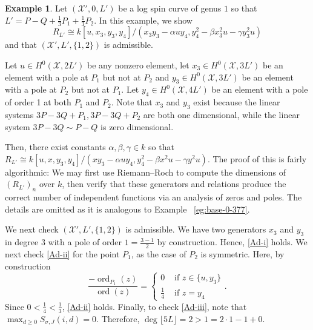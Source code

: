 \documentclass{amsart}
\theoremstyle{plain}
\theoremstyle{definition}
\newtheorem{example}[thm]{Example}
\theoremstyle{remark}
\numberwithin{equation}{section}
\DeclareMathOperator{\ord}{ord}
\newcommand\sx{\mathscr X}
\newcommand{\halfcan}{L}
\begin{document}
\begin{example}
\label{eg:base-1-33}
Let $(\sx',0 ,\halfcan')$ be a log spin curve of genus $1$ so that $\halfcan' = P - Q + \frac{1}{3}P_1 + \frac{1}{3}P_2$. In this example, we show
$$R_{\halfcan'} \cong k[u, x_3, y_3, y_4]/(x_3 y_3- \alpha uy_4, y_4^2 - \beta x_3^2 u - \gamma y_3^2u)$$
and that $(\sx', \halfcan',\{1,2\})$ is admissible.

Let $u \in H^0(\sx,2\halfcan')$ be any nonzero element, let $x_3 \in H^0(\sx,3\halfcan')$ be an element with a pole at $P_1$ but not at $P_2$ and $y_3 \in H^0(\sx,3\halfcan')$ be an element with a pole at $P_2$ but not at $P_1$. Let $y_4 \in H^0(\sx,4\halfcan')$ be an element with a pole of order 1 at both $P_1$ and $P_2$. Note that $x_3$ and $y_3$ exist because the linear systems $3P - 3Q + P_1, 3P - 3Q + P_2$ are both one dimensional, while the linear system $3P - 3Q \sim P - Q$ is zero dimensional.

Then, there exist constants $\alpha,\beta,\gamma \in k$ so that 
$R_{\halfcan'} \cong k[u, x, y_3, y_4]/(xy_3- \alpha uy_4, y_4^2 - \beta x^2 u - \gamma y^2u).$ The proof of this is fairly algorithmic: We may first use Riemann--Roch to compute the dimensions of $(R_{\halfcan'})_n$ over $k$, then verify that these generators and relations produce the correct number of independent functions via an analysis of zeros and poles. The details are omitted as it is analogous to Example ~\ref{eg:base-0-377}.

We next check $(\sx', \halfcan',\{1,2\})$ is admissible. We have two generators $x_3$ and $y_3$ in degree 3 with a pole of order $1=\frac{3- 1}{2}$ by construction. Hence, \ref{Ad-i} holds. We next check \ref{Ad-ii} for the point $P_1$, as the case of $P_2$ is symmetric. Here, by construction
$$
\frac{-\ord_{P_1}(z)}{\ord(z)} = \begin{cases}
	0 &\text{ if }z \in \{u, y_3\}\\
	\frac{1}{4} &\text{ if }z = y_4
\end{cases}.$$
Since $0 < \frac{1}{4} < \frac{1}{3}$, \ref{Ad-ii} holds.
Finally, to check \ref{Ad-iii}, note that $\max_{d \geq 0}S_{\sigma,J}(i,d) = 0.$ Therefore, $\deg \lfloor 5L \rfloor  = 2 > 1 = 2 \cdot 1 - 1 + 0$.
\end{example}
\end{document}
